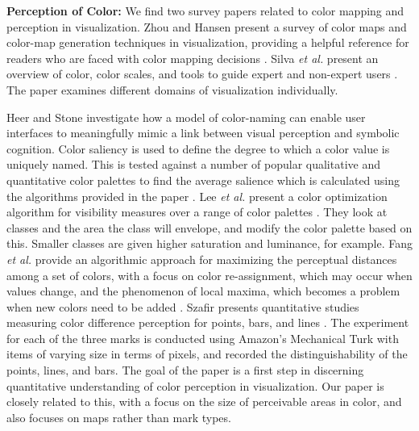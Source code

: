 \textbf{Perception of Color: }
We find two survey papers related to color mapping and perception in visualization. Zhou and Hansen present a survey of color maps and color-map generation techniques in visualization, providing a helpful reference for readers who are faced with color mapping decisions \cite{zhou2015survey}. Silva \textit{et al.}  present an overview of color, color scales, and tools to guide expert and non-expert users \cite{silva2011using}. The paper examines different domains of visualization individually.

Heer and Stone investigate how a model of color-naming can enable user interfaces to meaningfully mimic a link between visual perception and symbolic cognition. Color saliency is used to define the degree to which a color value is uniquely named. This is tested against a number of popular qualitative and quantitative color palettes to find the average salience which is calculated using the algorithms provided in the paper \cite{heer2012color}. Lee \textit{et al.} present a color optimization algorithm for visibility measures over a range of color palettes \cite{lee2013perceptually}. They look at classes and the area the class will envelope, and modify the color palette based on this. Smaller classes are given higher saturation and luminance, for example. Fang \textit{et al.} provide an algorithmic approach for maximizing the perceptual distances among a set of colors, with a focus on color re-assignment, which may occur when values change, and the phenomenon of local maxima, which becomes a problem when new colors need to be added \cite{fang2017categorical}. Szafir presents quantitative studies measuring color difference perception for points, bars, and lines \cite{szafir2018modeling}. The experiment for each of the three marks is conducted using Amazon's Mechanical Turk with items of varying size in terms of pixels, and recorded the distinguishability of the points, lines, and bars. The goal of the paper is a first step in discerning quantitative understanding of color perception in visualization. Our paper is closely related to this, with a focus on the size of perceivable areas in color, and also focuses on maps rather than mark types.

